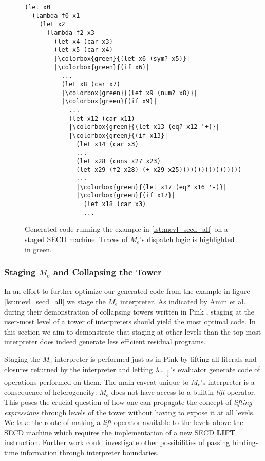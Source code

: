 \documentclass[a4paper,12pt,twoside,openright]{report}
\theoremstyle{definition}
\newcommand{\mslang}{$\lambda_{\uparrow\downarrow}$}
\newcommand{\mevl}{$M_{e}$}
\begin{document}
\begin{figure}[htp!]
\centering
    \begin{verbatim}
(let x0
  (lambda f0 x1
    (let x2
      (lambda f2 x3
        (let x4 (car x3)
        (let x5 (car x4)
        |\colorbox{green}{(let x6 (sym? x5)}|
        |\colorbox{green}{(if x6}|
          ...
          (let x8 (car x7)
          |\colorbox{green}{(let x9 (num? x8)}|
          |\colorbox{green}{(if x9}|
            ...
            (let x12 (car x11)
            |\colorbox{green}{(let x13 (eq? x12 '+)}|
            |\colorbox{green}{(if x13}|
              (let x14 (car x3)
              ...
              (let x28 (cons x27 x23)
              (let x29 (f2 x28) (+ x29 x25)))))))))))))))))
              ...
              |\colorbox{green}{(let x17 (eq? x16 '-)}|
              |\colorbox{green}{(if x17}|
                (let x18 (car x3)
                ...
    \end{verbatim}
\caption{Generated code running the example in \ref{lst:mevl_secd_all} on a staged SECD machine. Traces of \mevl's dispatch logic is highlighted in green.}
\label{lst:mevl_secd_ped}
\end{figure}
\newpage

\subsubsection{Staging \texorpdfstring{\mevl}{Lg} and Collapsing the Tower}\label{ssubsec:mevl_staged}
In an effort to further optimize our generated code from the example in figure \ref{lst:mevl_secd_all} we stage the \mevl{} interpreter. As indicated by Amin et al. during their demonstration of collapsing towers written in Pink \cite{amin2017collapsing}, staging at the user-most level of a tower of interpreters should yield the most optimal code. In this section we aim to demonstrate that staging at other levels than the top-most interpreter does indeed generate less efficient residual programs.

Staging the \mevl{} interpreter is performed just as in Pink by lifting all literals and closures returned by the interpreter and letting \mslang's evaluator generate code of operations performed on them. The main caveat unique to \mevl's interpreter is a consequence of heterogeneity: \mevl{} does not have access to a builtin \textit{lift} operator. This poses the crucial question of how one can propagate the concept of \textit{lifting expressions} through levels of the tower without having to expose it at all levels. We take the route of making a \textit{lift} operator available to the levels above the SECD machine which requires the implementation of a new SECD \textbf{LIFT} instruction. Further work could investigate other possibilities of passing binding-time information through interpreter boundaries.
\end{document}
